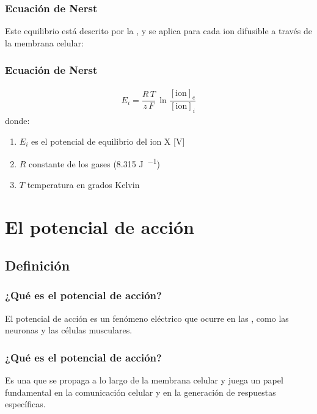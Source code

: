 \documentclass[14pt]{beamer}
\begin{document}
\begin{frame}
\frametitle{Ecuación de Nerst}
Este equilibrio está descrito por la , y se aplica para cada ion difusible a través de la membrana celular:
\end{frame}
\begin{frame}
\frametitle{Ecuación de Nerst}
\begin{align*}
E_{i} = \dfrac{R \, T}{z \, F} \, \ln \dfrac{\left[ \text{ion} \right]_{e}}{\left[ \text{ion} \right]_{i}}
\end{align*}
donde:
\begin{enumerate}[<+->]
\item $E_{i}$ es el potencial de equilibrio del ion X [V]
\item $R$ constante de los gases (\num{8.315} \unit{\joule\per{\kelvin\mol}})
\item $T$ temperatura en grados Kelvin
\end{enumerate}
\end{frame}

\section{El potencial de acción}
\subsection{Definición}

\begin{frame}
\frametitle{¿Qué es el potencial de acción?}
El potencial de acción es un fenómeno eléctrico que ocurre en las , como las neuronas y las células musculares.
\end{frame}
\begin{frame}
\frametitle{¿Qué es el potencial de acción?}
Es una  \pause que se propaga a lo largo de la membrana celular y juega un papel fundamental en la comunicación celular y en la generación de respuestas específicas.
\end{frame}
\end{document}
